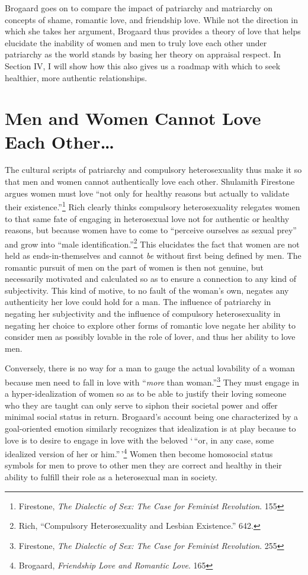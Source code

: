 Brogaard goes on to compare the impact of patriarchy and matriarchy on
concepts of shame, romantic love, and friendship love. While not the
direction in which she takes her argument, Brogaard thus provides a
theory of love that helps elucidate the inability of women and men to
truly love each other under patriarchy as the world stands by basing her
theory on appraisal respect. In Section IV, I will show how this also
gives us a roadmap with which to seek healthier, more authentic
relationships.

\section{Men and Women Cannot Love Each Other\ldots}

The cultural scripts of patriarchy and compulsory heterosexuality thus
make it so that men and women cannot authentically love each other.
Shulamith Firestone argues women must love ``not only for healthy
reasons but actually to validate their existence.''\footnote{Firestone,
  \emph{The Dialectic of Sex: The Case for Feminist Revolution}. 155}
Rich clearly thinks compulsory heterosexuality relegates women to that
same fate of engaging in heterosexual love not for authentic or healthy
reasons, but because women have to come to ``perceive ourselves as
sexual prey'' and grow into ``male identification.''\footnote{Rich,
  ``Compulsory Heterosexuality and Lesbian Existence.'' 642.} This
elucidates the fact that women are not held as ends-in-themselves and
cannot \emph{be} without first being defined by men. The romantic
pursuit of men on the part of women is then not genuine, but necessarily
motivated and calculated so as to ensure a connection to any kind of
subjectivity. This kind of motive, to no fault of the woman's own,
negates any authenticity her love could hold for a man. The influence of
patriarchy in negating her subjectivity and the influence of compulsory
heterosexuality in negating her choice to explore other forms of
romantic love negate her ability to consider men as possibly lovable in
the role of lover, and thus her ability to love men.

Conversely, there is no way for a man to gauge the actual lovability of
a woman because men need to fall in love with ``\emph{more} than
woman.''\footnote{Firestone, \emph{The Dialectic of Sex: The Case for
  Feminist Revolution}. 255} They must engage in a hyper-idealization of
women so as to be able to justify their loving someone who they are
taught can only serve to siphon their societal power and offer minimal
social status in return. Brogaard's account being one characterized by a
goal-oriented emotion similarly recognizes that idealization is at play
because to love is to desire to engage in love with the beloved `\,``or,
in any case, some idealized version of her or him.''\,'\footnote{Brogaard,
  \emph{Friendship Love and Romantic Love}. 165} Women then become
homosocial status symbols for men to prove to other men they are correct
and healthy in their ability to fulfill their role as a heterosexual man
in society.

